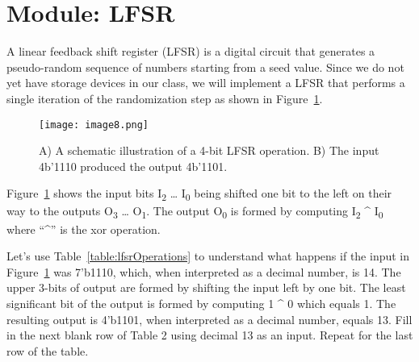 \section{Module: LFSR}

A linear feedback shift register (LFSR) is a digital circuit that
generates a pseudo-random sequence of numbers starting from a seed
value. Since we do not yet have storage devices in our class, we will
implement a LFSR that performs a single iteration of the randomization
step as shown in Figure~\ref{fig:lfsrOperation}.

\begin{figure}[ht]
    \texttt{[image: image8.png]}
\caption{A) A schematic illustration of a 4-bit LFSR operation. B) The
input 4b'1110 produced the output 4b'1101.}
\label{fig:lfsrOperation}
\end{figure}

Figure~\ref{fig:lfsrOperation} shows the input bits I\textsubscript{2} \ldots{}
I\textsubscript{0} being shifted one bit to the left on their way to the
outputs O\textsubscript{3} \ldots{} O\textsubscript{1}. The output
O\textsubscript{0} is formed by computing I\textsubscript{2} \^{}
I\textsubscript{0} where ``\^{}'' is the xor operation.

Let's use Table~\ref{table:lfsrOperations} to
understand what happens if the input in
Figure~\ref{fig:lfsrOperation}
was 7'b1110, which, when interpreted as a decimal number, is 14. The upper
3-bits of output are formed by shifting the input left by one bit. The
least significant bit of the output is formed by computing 1 \^{} 0
which equals 1. The resulting output is 4'b1101, when interpreted as a
decimal number, equals 13. Fill in the next blank row of Table 2 using
decimal 13 as an input. Repeat for the last row of the table.

